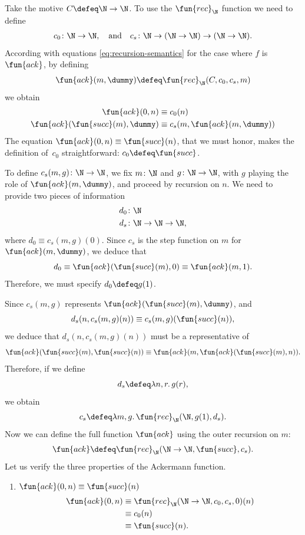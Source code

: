 \begin{solution}
    Take the motive $C\defeq\N\to\N$. To use the $\fun{rec}_\N$ function we need to define
    \begin{align*}
        c_0\colon\N\to\N,
        \quad\text{and}\quad
        c_s\colon\N\to(\N\to\N)\to(\N\to\N).
    \end{align*}
    According with equations \eqref{eq:recursion-semantics} for the case where $f$ is $\fun{ack}$, by defining
    \[
        \fun{ack}(m,\dummy)\defeq\fun{rec}_\N(C,c_0,c_s,m)
    \]
    we obtain
    \begin{align*}
        \fun{ack}(0,n)&\equiv c_0(n)\\
        \fun{ack}(\fun{succ}(m),\dummy)
            &\equiv c_s(m,\fun{ack}(m,\dummy))
    \end{align*}
    The equation $\fun{ack}(0,n)\equiv\fun{succ}(n)$, that we must honor, makes the definition of~$c_0$ straightforward: $c_0\defeq\fun{succ}$. 
    
    To define $c_s(m,g)\colon\N\to\N$, we fix $m\colon\N$ and $g\colon\N\to\N$, with $g$ playing the role of $\fun{ack}(m,\dummy)$, and proceed by recursion on $n$. We need to provide two pieces of information
    \begin{align*}
        d_0&\colon\N\\
        d_s&\colon\N\to\N\to\N,
    \end{align*}
    where $d_0\equiv c_s(m,g)(0)$. Since $c_s$ is the step function on $m$ for $\fun{ack}(m,\dummy)$, we deduce that
    \[
        d_0 \equiv \fun{ack}(\fun{succ}(m),0)\equiv\fun{ack}(m,1).
    \]
    Therefore, we must specify $d_0\defeq g(1)$.

    Since $c_s(m,g)$ represents $\fun{ack}(\fun{succ}(m),\dummy)$, and
    \[
        d_s(n,c_s(m,g)(n))\equiv c_s(m,g)(\fun{succ}(n)),
    \]
    we deduce that $d_s(n,c_s(m,g)(n))$ must be a representative of
    \[
        \fun{ack}(\fun{succ}(m),\fun{succ}(n))
            \equiv\fun{ack}(m,\fun{ack}(\fun{succ}(m),n)).
    \]
    Therefore, if we define
    \begin{equation}\label{eq:ds-definition}
        d_s\defeq\lambda n,r.\, g(r),
    \end{equation}
    we obtain
    \begin{equation}\label{eq:cs-from-ds}
        c_s \defeq \lambda m,g.\, \fun{rec}_\N(\N, g(1), d_s).
    \end{equation}
    Now we can define the full function $\fun{ack}$ using the outer recursion on $m$:
    \[
        \fun{ack} \defeq \fun{rec}_\N(\N\to\N, \fun{succ}, c_s).
    \]
    Let us verify the three properties of the Ackermann function.
    \begin{enumerate}[$\mbf\to$]
        \item $\fun{ack}(0, n) \equiv \fun{succ}(n)$
        \begin{align*}
            \fun{ack}(0, n)
                &\equiv \fun{rec}_\N(\N\to\N, c_0, c_s, 0)(n) \\
                &\equiv c_0(n) \\
                &\equiv \fun{succ}(n).
        \end{align*}


\end{enumerate}
\end{solution}
